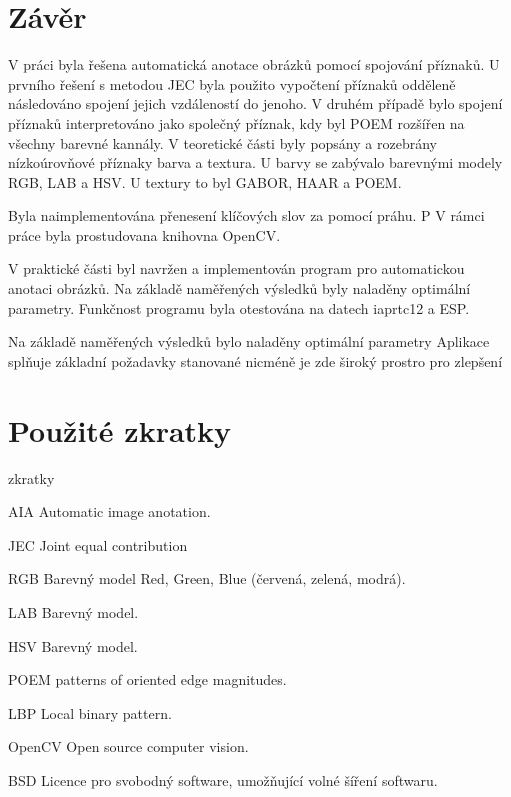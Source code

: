\documentclass[czech,BP]{thesiskiv}
\begin{document}
\chapter{Závěr}
\par V práci byla řešena automatická anotace obrázků pomocí spojování příznaků. U prvního řešení s metodou JEC byla použito vypočtení příznaků odděleně následováno spojení jejich vzdáleností do jenoho. V druhém případě bylo spojení příznaků interpretováno jako společný příznak, kdy byl POEM rozšířen na všechny barevné kannály.
V teoretické části byly popsány a rozebrány nízkoúrovňové příznaky barva a textura. U barvy se zabývalo barevnými modely RGB, LAB a HSV. U textury to byl GABOR, HAAR a POEM. 


Byla naimplementována přenesení klíčových slov za pomocí práhu.
P
V rámci práce byla prostudovana knihovna OpenCV. 

V praktické části byl navržen a implementován program pro automatickou anotaci obrázků. Na základě naměřených výsledků byly naladěny optimální parametry. 
Funkčnost programu byla otestována na datech iaprtc12 a ESP.

Na základě naměřených výsledků bylo naladěny optimální parametry
Aplikace splňuje základní požadavky stanované nicméně je zde široký prostro pro zlepšení

 
 
% 
%

\chapter{Použité zkratky}


\begin{labeling}{zkratky}
	\item [AIA] Automatic image anotation.	
	\item [JEC] Joint equal contribution
	\item [RGB] Barevný model Red, Green, Blue (červená, zelená, modrá).
	\item [LAB] Barevný model. 
	\item [HSV] Barevný model. 
	\item [POEM] patterns of oriented edge magnitudes.
	\item [LBP] Local binary pattern.
	\item [OpenCV] Open source computer vision.
	\item [BSD] Licence pro svobodný software, umožňující volné šíření softwaru.
\end{labeling}
\end{document}
